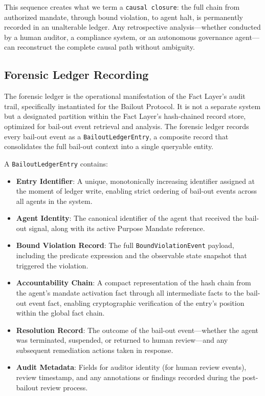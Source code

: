 This sequence creates what we term a \texttt{causal closure}: the full chain from authorized mandate, through bound violation, to agent halt, is permanently recorded in an unalterable ledger. Any retrospective analysis—whether conducted by a human auditor, a compliance system, or an autonomous governance agent—can reconstruct the complete causal path without ambiguity.

\subsection{Forensic Ledger Recording}
\label{subsection:bailout-forensic-ledger}

The forensic ledger is the operational manifestation of the Fact Layer's audit trail, specifically instantiated for the Bailout Protocol. It is not a separate system but a designated partition within the Fact Layer's hash-chained record store, optimized for bail-out event retrieval and analysis. The forensic ledger records every bail-out event as a \texttt{BailoutLedgerEntry}, a composite record that consolidates the full bail-out context into a single queryable entity.

A \texttt{BailoutLedgerEntry} contains:

\begin{itemize}
  \item \textbf{Entry Identifier}: A unique, monotonically increasing identifier assigned at the moment of ledger write, enabling strict ordering of bail-out events across all agents in the system.

  \item \textbf{Agent Identity}: The canonical identifier of the agent that received the bail-out signal, along with its active Purpose Mandate reference.

  \item \textbf{Bound Violation Record}: The full \texttt{BoundViolationEvent} payload, including the predicate expression and the observable state snapshot that triggered the violation.

  \item \textbf{Accountability Chain}: A compact representation of the hash chain from the agent's mandate activation fact through all intermediate facts to the bail-out event fact, enabling cryptographic verification of the entry's position within the global fact chain.

  \item \textbf{Resolution Record}: The outcome of the bail-out event—whether the agent was terminated, suspended, or returned to human review—and any subsequent remediation actions taken in response.

  \item \textbf{Audit Metadata}: Fields for auditor identity (for human review events), review timestamp, and any annotations or findings recorded during the post-bailout review process.
\end{itemize}

